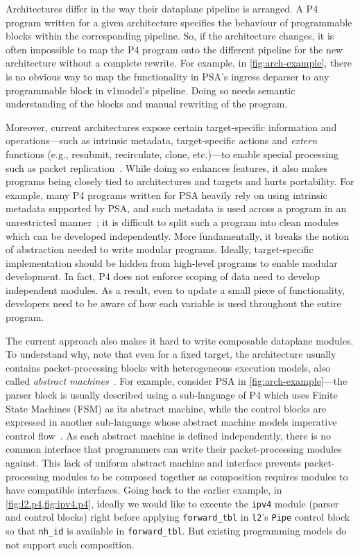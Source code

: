 \documentclass[letterpaper,twocolumn,10pt]{article}
\begin{document}
Architectures differ in the way their dataplane pipeline is arranged.
A P4 program written for a given architecture specifies the behaviour
of programmable blocks within the corresponding pipeline. So, if the
architecture changes, it is often impossible to map the P4 program
onto the different pipeline for the new architecture without a
complete rewrite. For example, in \cref{fig:arch-example}, there is no
obvious way to map the functionality in PSA's ingress deparser to any
programmable block in v1model's pipeline. Doing so needs semantic
understanding of the blocks and manual rewriting of the program.

Moreover, current architectures expose certain target-specific
information and operations---such as intrinsic metadata,
target-specific actions and \emph{extern} functions (e.g., resubmit,
recirculate, clone, etc.)---to enable special processing such as
packet replication~\cite{simple_switch.md,psa}. While doing so
enhances features, it also makes programs being closely tied to
architectures and targets and hurts portability. For example, many P4
programs written for PSA heavily rely on using intrinsic metadata
supported by PSA, and such metadata is used across a program in an
unrestricted manner~\cite{switch.p4}; it is difficult to split such a
program into clean modules which can be developed independently.  More
fundamentally, it breaks the notion of abstraction needed to write
modular programs.  Ideally, target-specific implementation should be
hidden from high-level programs to enable modular development. In
fact, P4 does not enforce scoping of data need to develop independent
modules. As a result, even to update a small piece of functionality,
developers need to be aware of how each variable is used throughout
the entire program.

The current approach also makes it hard to write composable dataplane
modules. To understand why, note that even for a fixed target, the
architecture usually contains packet-processing blocks with
heterogeneous execution models, also called \emph{abstract
machines}~\cite{p4lang,van1991machine}. For example, consider PSA in
\cref{fig:arch-example}---the parser block  is usually described using
a sub-language of P4 which uses Finite State Machines (FSM) as its
abstract machine, while the control blocks are expressed in another
sub-language whose abstract machine models imperative control
flow~\cite{p4lang}. As each abstract machine is defined independently,
there is no common interface that programmers can write their
packet-processing modules against. This lack of uniform abstract
machine and interface prevents packet-processing modules to be
composed together as composition requires modules to have compatible
interfaces. Going back to the earlier example, in
\cref{fig:l2.p4,fig:ipv4.p4}, ideally we would like to execute the
\texttt{ipv4} module (parser and control blocks) right before applying
\texttt{forward\_tbl} in \texttt{l2}'s \texttt{Pipe} control block so
that \texttt{nh\_id} is available in \texttt{forward\_tbl}. But
existing programming models do not support such composition.
\end{document}
